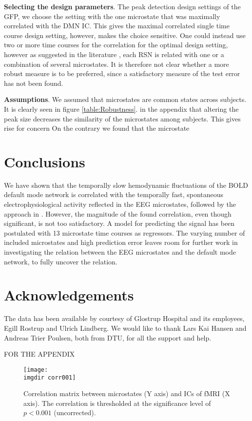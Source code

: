 \documentclass{article}
\newcommand{\imgdir}{Images/} %
\begin{document}
\textbf{Selecting the design parameters}. The peak detection design settings of the GFP, we choose the setting with the one microstate that was maximally correlated with the DMN IC. This gives the maximal correlated single time course design setting, however, makes the choice sensitive. One could instead use two or more time courses for the correlation for the optimal design setting, however as suggested in the literature \cite{Yuan20122062}, each RSN is related with one or a combination of several microstates. It is therefore not clear whether a more robust measure is to be preferred, since a satisfactory measure of the test error has not been found.

\textbf{Assumptions}. We assumed that microstates are common states across subjects. It is clearly seen in figure \ref{table:Robustness}. in the appendix that altering the peak size decreases the similarity of the microstates among subjects. This gives rise for concern 
On the contrary we found that the microstate


\section{Conclusions}
We have shown that the temporally slow hemodynamic fluctuations of the BOLD default mode network is correlated with the temporally fast, spontaneous electrophysiological activity reflected in the EEG microstates, followed by the approach in \cite{Yuan20122062}. However, the magnitude of the found correlation, even though significant, is not too satisfactory. A model for predicting the signal has been postulated with 13 microstate time courses as regressors. The varying number of included microstates and high prediction error leaves room for further work in investigating the relation between the EEG microstates and the default mode network, to fully uncover the relation.

\section{Acknowledgements}
The data has been available by courtesy of Glostrup Hospital and its employees, Egill Rostrup and Ulrich Lindberg. We would like to thank Lars Kai Hansen and
Andreas Trier Poulsen, both from DTU, for all the support and help.



\newpage
FOR THE APPENDIX
\begin{figure}[!ht]
    \centering
    \texttt{[image: \\imgdir corr001]}
    \caption{Correlation matrix between microstates (Y axis) and ICs of fMRI (X axis). The correlation is thresholded at the significance level of $p<0.001$ (uncorrected).}
    \label{fig:corr001}
\end{figure}
\end{document}
